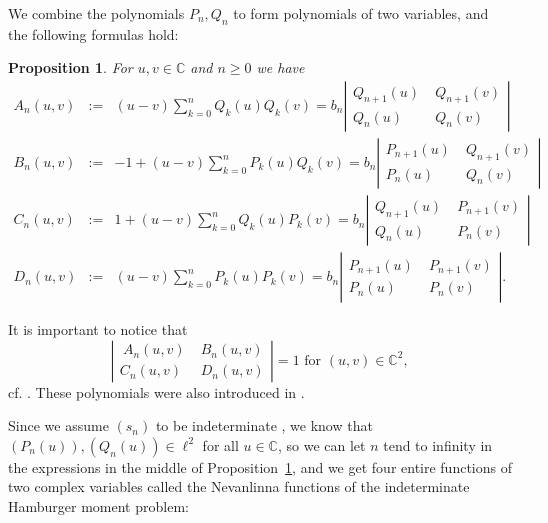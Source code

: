 \documentclass[12pt]{article}
\newtheorem{prop}[thm]{Proposition}
\newcommand{\C}{\mathbb{C}}
\def\C{\mathbb{C}}
\begin{document}
 We combine the polynomials $P_n,Q_n$ to form polynomials of two variables, and 
the following formulas hold:
\begin{prop}\cite[Proposition 5.24]{Sch}\label{thm:An-Dn} For $u,v\in\C$ and $n\ge 0$ we have
\begin{eqnarray*}
A_n(u,v)&:=&(u-v)\sum_{k=0}^nQ_k(u)Q_k(v)=
b_n\left|\begin{array}{cc}
 Q_{n+1}(u)&\;Q_{n+1}(v)\\Q_{n}(u)&\;Q_{n}(v)\end{array}\right|\\
B_n(u,v)&:=&-1+(u-v)\sum_{k=0}^n P_k(u)Q_k(v)=
b_n\left|\begin{array}{cc}
P_{n+1}(u)&\;Q_{n+1}(v)\\P_{n}(u)&\;Q_{n}(v)\end{array}\right|\\
C_n(u,v)&:=&1+(u-v)\sum_{k=0}^n Q_k(u)P_k(v)=
b_n\left|\begin{array}{cc}
Q_{n+1}(u)&\;P_{n+1}(v)\\
Q_{n}(u)&\;P_{n}(v)\end{array}\right|\\
D_n(u,v)&:=&(u-v)\sum_{k=0}^nP_k(u)P_k(v)=
b_n\left|\begin{array}{cc}
P_{n+1}(u)&\;P_{n+1}(v)\\
P_{n}(u)&\;P_{n}(v)\end{array}\right|.
\end{eqnarray*}
\end{prop}

It is important to notice that
\begin{equation*}\label{eq:det4}
\left|\begin{array}{cc}\ A_n(u,v)&\;B_n(u,v)\\
 C_n(u,v)&\; D_n(u,v)\end{array}\right|=1\textrm{ for }(u,v)\in\mathbb
C^2,
\end{equation*}
cf. \cite[Equation(5.57)]{Sch}. These polynomials were also introduced in \cite[p. 123]{Ak}.

Since we assume $(s_n)$ to be indeterminate , we know that $(P_n(u)), (Q_n(u))\in\ell^2$ for all $u\in\C$, so we can let $n$ tend to infinity in the expressions in the middle of Proposition~\ref{thm:An-Dn}, and we get four entire functions of two complex variables called the Nevanlinna functions of the indeterminate Hamburger moment problem:
\end{document}
